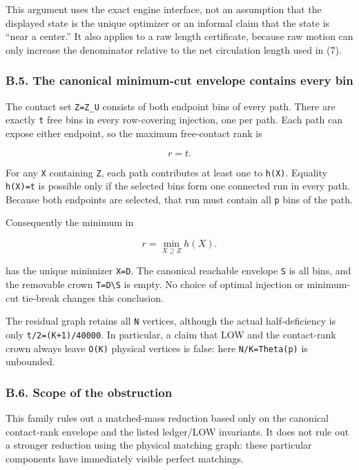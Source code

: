 This argument uses the exact engine interface, not an assumption that the displayed state is the unique optimizer or an informal claim that the state is ``near a center.'' It also applies to a raw length certificate, because raw motion can only increase the denominator relative to the net circulation length used in (7).

\hypertarget{af-f687f276ee-b.5.-the-canonical-minimum-cut-envelope-contains-every-bin}{%
\subsubsection{B.5. The canonical minimum-cut envelope contains every bin}\label{af-f687f276ee-b.5.-the-canonical-minimum-cut-envelope-contains-every-bin}}

The contact set \texttt{Z=Z\_U} consists of both endpoint bins of every path. There are exactly \texttt{t} free bins in every row-covering injection, one per path. Each path can expose either endpoint, so the maximum free-contact rank is

\[
r=t.\tag{9}
\]

For any \texttt{X} containing \texttt{Z}, each path contributes at least one to \texttt{h(X)}. Equality \texttt{h(X)=t} is possible only if the selected bins form one connected run in every path. Because both endpoints are selected, that run must contain all \texttt{p} bins of the path.

Consequently the minimum in

\[
r=\min_{X\supseteq Z}h(X).
\]

has the unique minimizer \texttt{X=D}. The canonical reachable envelope \texttt{S} is all bins, and the removable crown \texttt{T=D\textbackslash{}S} is empty. No choice of optimal injection or minimum-cut tie-break changes this conclusion.

The residual graph retains all \texttt{N} vertices, although the actual half-deficiency is only \texttt{t/2=(K+1)/40000}. In particular, a claim that LOW and the contact-rank crown always leave \texttt{O(K)} physical vertices is false: here \texttt{N/K=Theta(p)} is unbounded.

\hypertarget{af-f687f276ee-b.6.-scope-of-the-obstruction}{%
\subsubsection{B.6. Scope of the obstruction}\label{af-f687f276ee-b.6.-scope-of-the-obstruction}}

This family rules out a matched-mass reduction based only on the canonical contact-rank envelope and the listed ledger/LOW invariants. It does not rule out a stronger reduction using the physical matching graph: these particular components have immediately visible perfect matchings.

